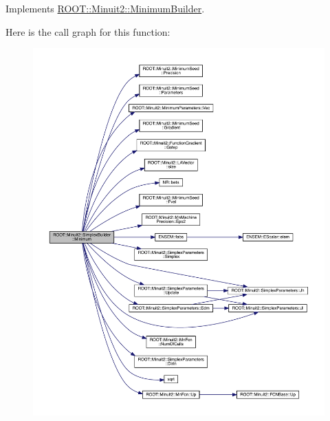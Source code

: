 Implements \mbox{\hyperlink{classROOT_1_1Minuit2_1_1MinimumBuilder_aefaa624436afa8195af1f3393a35981f}{R\+O\+O\+T\+::\+Minuit2\+::\+Minimum\+Builder}}.

Here is the call graph for this function\+:\nopagebreak
\begin{figure}[H]
\begin{center}
\leavevmode
\includegraphics[width=350pt]{d1/dbe/classROOT_1_1Minuit2_1_1SimplexBuilder_a82c52765929e3f4a41b1abe1473d4140_cgraph}
\end{center}
\end{figure}
\mbox{\label{classROOT_1_1Minuit2_1_1SimplexBuilder_a68ea5d16ee89941e9674eb673dbde593}} 
